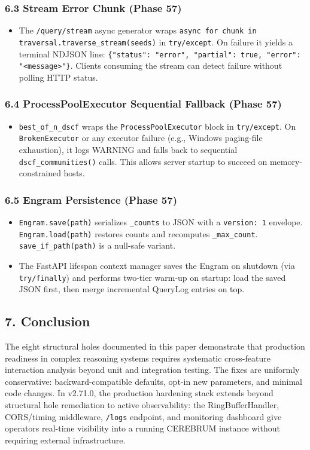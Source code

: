 \subsubsection*{6.3 Stream Error Chunk (Phase 57)}
\begin{itemize}
  \item The \texttt{/query/stream} async generator wraps \texttt{async for chunk in traversal.traverse\_stream(seeds)} in \texttt{try/except}. On failure it yields a terminal NDJSON line: \texttt{\{"status": "error", "partial": true, "error": "<message>"\}}. Clients consuming the stream can detect failure without polling HTTP status.
\end{itemize}


\subsubsection*{6.4 ProcessPoolExecutor Sequential Fallback (Phase 57)}
\begin{itemize}
  \item \texttt{best\_of\_n\_dscf} wraps the \texttt{ProcessPoolExecutor} block in \texttt{try/except}. On \texttt{BrokenExecutor} or any executor failure (e.g., Windows paging-file exhaustion), it logs WARNING and falls back to sequential \texttt{dscf\_communities()} calls. This allows server startup to succeed on memory-constrained hosts.
\end{itemize}


\subsubsection*{6.5 Engram Persistence (Phase 57)}
\begin{itemize}
  \item \texttt{Engram.save(path)} serializes \texttt{\_counts} to JSON with a \texttt{version: 1} envelope. \texttt{Engram.load(path)} restores counts and recomputes \texttt{\_max\_count}. \texttt{save\_if\_path(path)} is a null-safe variant.
  \item The FastAPI lifespan context manager saves the Engram on shutdown (via \texttt{try/finally}) and performs two-tier warm-up on startup: load the saved JSON first, then merge incremental QueryLog entries on top.
\end{itemize}


\subsection*{7. Conclusion}
The eight structural holes documented in this paper demonstrate that production readiness in complex reasoning systems requires systematic cross-feature interaction analysis beyond unit and integration testing. The fixes are uniformly conservative: backward-compatible defaults, opt-in new parameters, and minimal code changes. In v2.71.0, the production hardening stack extends beyond structural hole remediation to active observability: the RingBufferHandler, CORS/timing middleware, \texttt{/logs} endpoint, and monitoring dashboard give operators real-time visibility into a running CEREBRUM instance without requiring external infrastructure.


